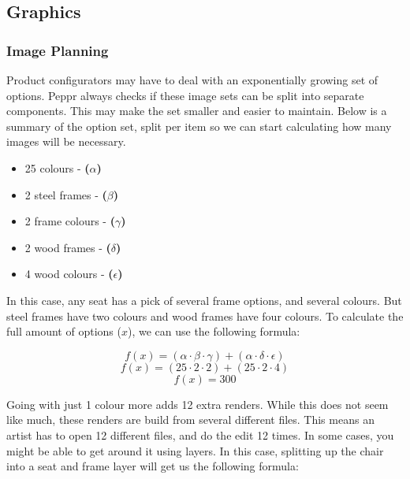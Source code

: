 \subsection{Graphics}

\subsubsection{Image Planning}
Product configurators may have to deal with an exponentially growing set of options. Peppr always checks if these image sets can be split into separate components. This may make the set smaller and easier to maintain. Below is a summary of the option set, split per item so we can start calculating how many images will be necessary.
\begin{itemize}
	\item 25 colours - \textbf{(\( \alpha \))}
	\item 2 steel frames - \textbf{(\( \beta \))}
	\item 2 frame colours - \textbf{(\( \gamma \))}
	\item 2 wood frames - \textbf{(\( \delta \))}
	\item 4 wood colours - \textbf{(\( \epsilon \))}
\end{itemize}

In this case, any seat has a pick of several frame options, and several colours. But steel frames have two colours and wood frames have four colours. To calculate the full amount of options ($x$), we can use the following formula:
 
\[ f(x) = (\alpha \cdot \beta \cdot \gamma) + (\alpha \cdot \delta \cdot \epsilon)\]
\[ f(x) = (25 \cdot 2 \cdot 2) + (25 \cdot 2 \cdot 4)\]
\[ f(x) = 300\]

Going with just 1 colour more adds 12 extra renders. While this does not seem like much, these renders are build from several different files. This means an artist has to open 12 different files, and do the edit 12 times.
In some cases, you might be able to get around it using layers. In this case, splitting up the chair into a seat and frame layer will get us the following formula:

